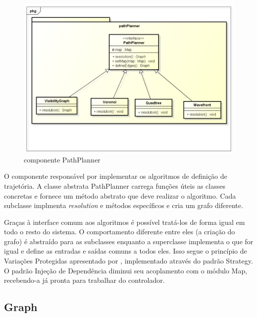 \begin{figure}[h]
	\centering
	\label{fig25}
		\includegraphics[keepaspectratio=true,scale=0.5]{figuras/pkgpathplanner.png}
	\caption{componente PathPlanner}
\end{figure}

O componente responsável por implementar os algoritmos de definição de trajetória. A classe abstrata PathPlanner carrega funções úteis as classes concretas e fornece um método abstrato que deve realizar o algoritmo. Cada subclasse implmenta \textit{resolution} e métodos específicos e cria um grafo diferente.

Graças à interface comum aos algoritmos é possível tratá-los de forma igual em todo o resto do sistema. O comportamento diferente entre eles (a criação do grafo) é abstraído para as subclasses enquanto a superclasse implementa o que for igual e define as entradas e saídas comuns a todos eles. Isso segue o princípio de Variações Protegidas apresentado por \cite{Larman2005}, implementado através do padrão Strategy. O padrão Injeção de Dependência diminui seu acoplamento com o módulo Map, recebendo-a já pronta para trabalhar do controlador.

\subsection{Graph}

